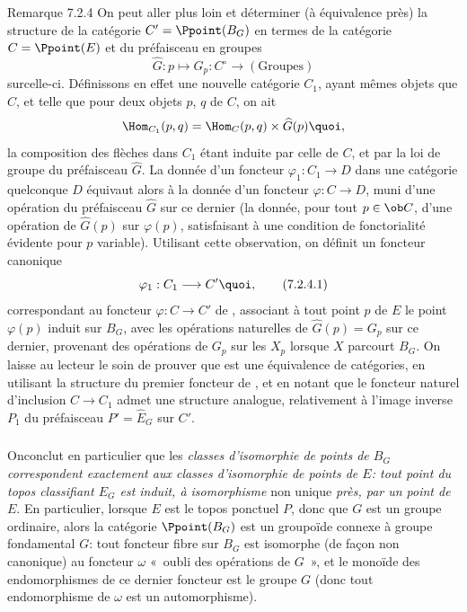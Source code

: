 \documentclass[10pt]{../fichiers-configuration-latex/smfart}
\begin{document}
\begin{enonce*}[remark]{Remarque 7.2.4}
On peut aller plus loin et déterminer (à équivalence près) la
structure de la catégorie $C'=\Ppoint(B_G)$ en termes de la
catégorie $C=\Ppoint(E)$ et du préfaisceau en groupes
$$
\widehat{G}:p\longmapsto G_p: C^{\circ}\longrightarrow
(\text{Groupes})
$$
sur\pageoriginale celle-ci. Définissons en effet une nouvelle
catégorie $C_1$, ayant mêmes objets que $C$, et telle que pour deux
objets $p$, $q$ de $C$, on ait
$$
\Hom_{C_1}(p,q)=\Hom_C(p,q)\times \widehat{G}(p){\quoi},
$$
la composition des flèches dans $C_1$ étant induite par celle de
$C$, et par la loi de groupe du préfaisceau $\widehat{G}$. La donnée
d'un foncteur $\varphi_1:C_1\rightarrow D$ dans une catégorie
quelconque $D$ équivaut alors à la donnée d'un foncteur
$\varphi:C\rightarrow D$, muni d'une opération du préfaisceau
$\widehat{G}$ sur ce dernier (\ie la donnée, pour tout $p\in \ob C$,
d'une opération de $\widehat{G}(p)$ sur $\varphi(p)$, satisfaisant à
une condition de fonctorialité évidente pour $p$ variable).
Utilisant cette observation, on définit un foncteur canonique
\begin{equation*}
\varphi_1:C_1\longrightarrow C'{\quoi},\tag{7.2.4.1}
\end{equation*}
correspondant au foncteur $\varphi:C\rightarrow C'$ de
, associant à tout point $p$ de $E$ le point
$\varphi(p)$ induit sur $B_G$, avec les opérations naturelles de
$\widehat{G}(p)=G_p$ sur ce dernier, provenant des opérations de
$G_p$ sur les $X_p$ lorsque $X$ parcourt $B_G$. On laisse au lecteur
le soin de prouver que  est une équivalence de
catégories, en utilisant la structure  du premier
foncteur de , et en notant que le foncteur naturel
d'inclusion $C\rightarrow C_1$ admet une structure analogue,
relativement à l'image inverse $P_1$ du préfaisceau
$P'=\widehat{E}_G$ sur $C'$.
\end{enonce*}

\setcounter{subsubsection}{4}
\subsubsection{}
On\pageoriginale conclut en particulier que les \emph{classes
d'isomorphie de points de $B_G$ correspondent exactement aux classes
d'isomorphie de points de $E$: tout point du topos classifiant $E_G$
est induit, à isomorphisme} non unique \emph{près, par un point de
$E$}. En particulier, lorsque $E$ est le topos ponctuel $P$, donc
que $G$ est un groupe ordinaire, alors la catégorie $\Ppoint(B_G)$
est un groupoïde connexe à groupe fondamental $G$: tout foncteur
fibre sur $B_G$ est isomorphe (de façon non canonique) au
foncteur $\omega$ « oubli des opérations de $G$ », et le monoïde
des endomorphismes de ce dernier foncteur est le groupe $G$ (donc
tout endomorphisme de $\omega$ est un automorphisme).
\end{document}

